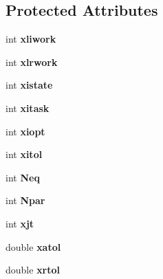 \subsection*{Protected Attributes}
\begin{DoxyCompactItemize}
\item 
\mbox{\label{classodepack__dlsoda_a6c98ce6ec86aae4fea34ed04230bf0f8}} 
int {\bfseries xliwork}
\item 
\mbox{\label{classodepack__dlsoda_a14a08a08073c9013bdac66a5addaac88}} 
int {\bfseries xlrwork}
\item 
\mbox{\label{classodepack__dlsoda_a839d1d413392db48d73f8442d2a5f162}} 
int {\bfseries xistate}
\item 
\mbox{\label{classodepack__dlsoda_a169bda738ab8d3200068109d18ce6bbf}} 
int {\bfseries xitask}
\item 
\mbox{\label{classodepack__dlsoda_a4b57efab0a49bc331ef04d65f0da60bc}} 
int {\bfseries xiopt}
\item 
\mbox{\label{classodepack__dlsoda_a731987a2a4da7215a053be9c33188732}} 
int {\bfseries xitol}
\item 
\mbox{\label{classodepack__dlsoda_accd405a79221a13138eb1055d8fdb4f4}} 
int {\bfseries Neq}
\item 
\mbox{\label{classodepack__dlsoda_a41b802250255bfbb9c7b3a0b0e3545c8}} 
int {\bfseries Npar}
\item 
\mbox{\label{classodepack__dlsoda_a20ae2db2c2db96c2a084702f6b4290d4}} 
int {\bfseries xjt}
\item 
\mbox{\label{classodepack__dlsoda_a4d7b9b709e97aa1e5a37f5e405e300d3}} 
double {\bfseries xatol}
\item 
\mbox{\label{classodepack__dlsoda_a8e8b3aad24b1ab9ae0971bffba41b78a}} 
double {\bfseries xrtol}
\item 

\end{DoxyCompactItemize}
